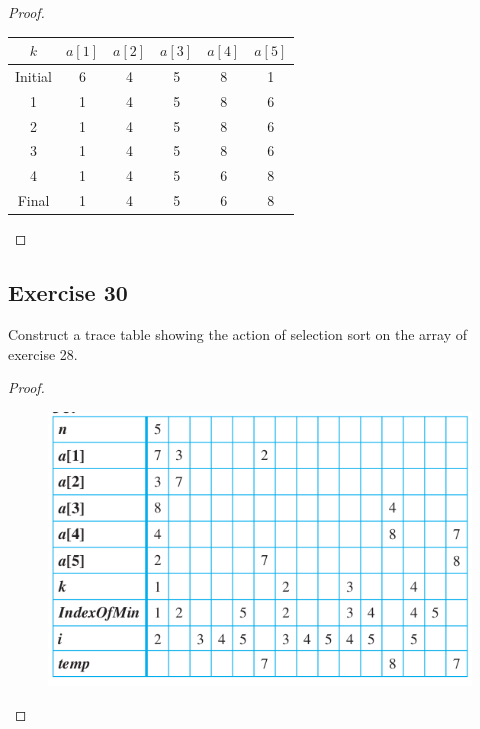 \documentclass[14pt]{extarticle}
\begin{document}
\begin{proof}
    \begin{center}
        \begin{tabular}{|c|c|c|c|c|c|}
            \hline
            \(k\)   & \(a[1]\) & \(a[2]\) & \(a[3]\) & \(a[4]\) & \(a[5]\) \\
            \hline
            Initial & 6        & 4        & 5        & 8        & 1        \\
            \hline
            1       & 1        & 4        & 5        & 8        & 6        \\
            \hline
            2       & 1        & 4        & 5        & 8        & 6        \\
            \hline
            3       & 1        & 4        & 5        & 8        & 6        \\
            \hline
            4       & 1        & 4        & 5        & 6        & 8        \\
            \hline
            Final   & 1        & 4        & 5        & 6        & 8        \\
            \hline
        \end{tabular}
    \end{center}
\end{proof}

\subsection{Exercise 30}
Construct a trace table showing the action of selection sort on the array of exercise 28.

\begin{proof}
    \begin{figure}[ht!]
        \centering
        \includegraphics[scale=0.6]{../images/11.3.30.png}
    \end{figure}
\end{proof}
\end{document}
